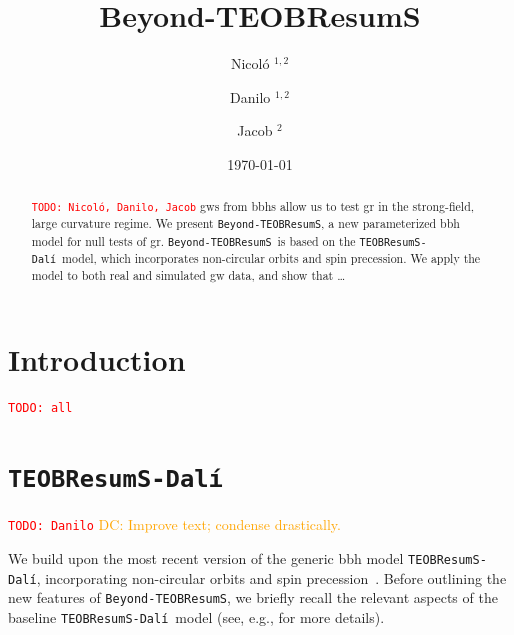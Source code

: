 \documentclass[prd,amssymb,amsmath,amsfonts,nofootinbib,reprint,showpacs,longbibliography]{revtex4-1}
\def\TEOBResumSDali{\texttt{TEOBResumS-Dalí}}
\def\TEOBB{\texttt{Beyond-TEOBResumS}}
\newcommand{\DC}[1]{{\textcolor{orange}{{DC: #1}} }}
\newcommand{\todo}[1]{\textcolor{red}{\texttt{TODO: #1}}}
\newcommand{\dali}[0]{\texttt{TEOBResumS-Dalí}}
\begin{document}
\title{Beyond-TEOBResumS}

\author{Nicol\'o ${}^{1,2}$}
\author{Danilo ${}^{1,2}$}
\author{Jacob ${}^{2}$}


\begin{abstract}
\todo{Nicol\'o, Danilo, Jacob}
\Acp{gw} from \acp{bbh} allow us to test \ac{gr} in the strong-field, large curvature regime.
We present \TEOBB, a new parameterized \ac{bbh} model for null tests of \ac{gr}.
\TEOBB~is based on the \TEOBResumSDali~model, which incorporates non-circular orbits and spin precession.
We apply the model to both real and simulated \ac{gw} data, and show that \dots
\end{abstract}

\date{\today}
\maketitle

\acresetall

\section{Introduction}
\todo{all}

\section{\dali}
\label{sec:dali_base}
\todo{Danilo}
\DC{Improve text; condense drastically.}

We build upon the most recent version of the generic \ac{bbh} model \TEOBResumSDali, incorporating non-circular
orbits and spin precession~\cite{Nagar:2024oyk, Gamba:2024cvy, Albanesi:2025txj}. 
Before outlining the new features of \TEOBB, we briefly recall the relevant
aspects of the baseline \dali~model (see, e.g., \cite{Nagar:2024oyk} for more details).
\end{document}
